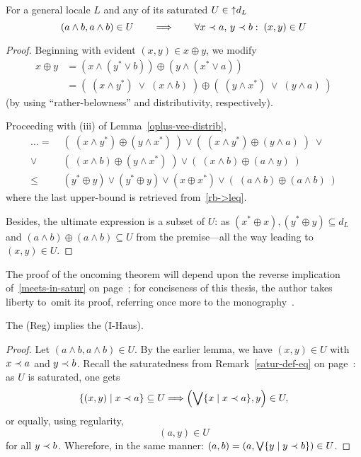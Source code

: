 \begin{lem}
  For a general locale $L$ and any of its saturated $U\in \left\uparrow
  d_L\right.$
  \[
    (a \wedge b, a \wedge b) \in U \qquad \Longrightarrow \qquad \forall x \prec
    a, \, y \prec b: \; (x, y) \in U
  \]
\end{lem}
\begin{proof}
  Beginning with evident $(x, y)\in x \oplus y$, we modify
  \begin{align*}
    x \oplus y &= (x \wedge (y^* \vee b)) \oplus (y \wedge (x^* \vee a)) \\
               &= (\; (x \wedge y^*) \; \vee \; (x \wedge b) \; ) \oplus (\; (y
    \wedge x^*) \; \vee \; (y \wedge a) \; )
  \end{align*}
  (by using ``rather-belowness'' and distributivity, respectively).

  Proceeding with (iii) of Lemma~\ref{oplus-vee-distrib}\thinspace,
  \begin{align*}
     \ldots = \; &(\; (x \wedge y^*) \oplus (y \wedge x^*) \; ) \vee 
            (\; (x \wedge y^*) \oplus (y \wedge a) \; ) \; \vee \\
            \vee \; &(\; (x \wedge b) \oplus (y \wedge x^*) \; ) \vee
            (\; (x \wedge b) \oplus (a \wedge y) \; ) \\
     \leq \; &(y^*\oplus y) \vee (y^*\oplus y) \vee (x\oplus x^*) \vee
                  (\; (a \wedge b)\oplus(a \wedge b) \;)
  \end{align*}
  where the last upper-bound is retrieved from~\ref{rb->leq}\thinspace.

  Besides, the ultimate expression is a subset of $U$:
  as $(x^*\oplus x), (y^*\oplus y)\subseteq d_L$ and $(a \wedge b)\oplus(a
  \wedge b)\subseteq U$ from the premise---all the way leading to $(x, y)\in
  U$.
\end{proof}

The proof of the oncoming theorem will depend upon the reverse implication
of~\ref{meets-in-satur} on page~\pageref{meets-in-satur}\thinspace;
for conciseness of this thesis, the author takes liberty to~omit its proof,
referring once more to the monography~\cite{picado-pultr12}.

\begin{thm}
  The (Reg) implies the (I-Haus).
\end{thm}
\begin{proof}
  Let $(a \wedge b, a \wedge b) \in U$.
  By the earlier lemma, we have $(x, y)\in U$ with $x \prec a$ and $y \prec b$.
  Recall the saturatedness from Remark~\ref{satur-def-eq} on
  page~\pageref{satur-def-eq}\thinspace:
  as $U$ is saturated, one gets
  \[
    \left\{ (x, y) \mid x \prec a \right\} \subseteq U
    \Longrightarrow
    \left(\bigvee \{x \mid x \prec a\}, y\right)\in U,
  \]
  or equally, using regularity,
  \[
    \left(a, y\right)\in U
  \]
  for all $y \prec b$.
  Wherefore, in the same manner: $(a, b) = \left(a, \bigvee \{y \mid y \prec
  b\}\right)\in U$.
\end{proof}

